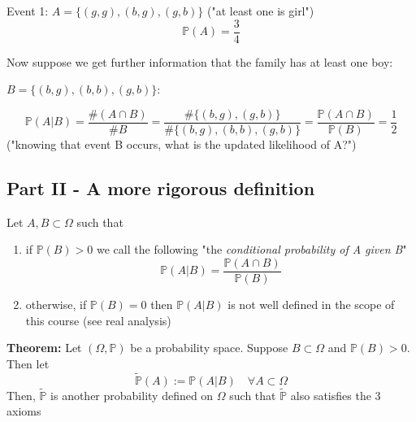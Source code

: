 \documentclass[12pt]{article}
\renewcommand{\P}{\mathbb{P}}
\begin{document}
Event 1: $A = \{(g, g), (b, g), (g, b)\}$ ("at least one is girl") 
\[\P(A) = \frac{3}{4}\]

Now suppose we get further information that the family has at least one boy: 

$B = \{(b, g), (b, b), (g, b)\}$:


\[\P(A | B) = \frac{\#(A \cap B)}{\# B} = \frac{\#\{(b, g), (g, b)\}}{\#\{(b, g), (b, b), (g, b)\}}  = \frac{\P(A \cap B)}{\P(B)} = \frac{1}{2}\]
("knowing that event B occurs, what is the updated likelihood of A?")

\subsection*{Part II - A more rigorous definition}
Let $A, B \subset \Omega$ such that 
\begin{enumerate}
    \item if $\P(B) > 0$ we call the following "the \emph{conditional probability of A given B}"
    \[\P(A | B) = \frac{\P(A \cap B)}{\P(B)}\]
    \item otherwise, if $\P(B) = 0$ then $\P(A | B)$ is not well defined in the scope of this course (see real analysis) 
\end{enumerate}

\textbf{Theorem:} Let $(\Omega, \P)$ be a probability space. Suppose $B \subset \Omega$ and $\P(B) > 0$. Then let
\[\tilde{\P}(A) := \P(A | B) \quad \forall A \subset \Omega\]
Then, $\tilde{\P}$ is another probability defined on $\Omega$ such that $\tilde{\P}$ also satisfies the 3 axioms 
\end{document}

